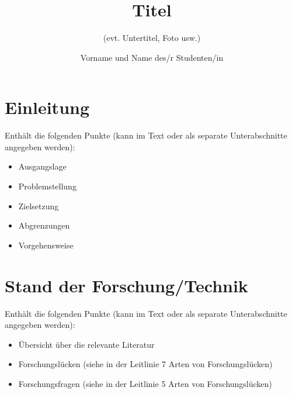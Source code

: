 \documentclass{ffhsthesis}
\begin{document}
\title{Titel}
\subtitle{(evt. Untertitel, Foto usw.)} %
\author{Vorname und Name des/r Studenten/in}

\maketitle

\newpage
\tableofcontents

\newpage

\startThesis %

\chapter{Einleitung}

Enthält die folgenden Punkte (kann im Text oder als separate Unterabschnitte angegeben werden):

\begin{itemize}
    \item Ausgangslage
    \item Problemstellung
    \item Zielsetzung
    \item Abgrenzungen
    \item Vorgehensweise
\end{itemize}

\chapter{Stand der Forschung/Technik}

Enthält die folgenden Punkte (kann im Text oder als separate Unterabschnitte angegeben werden):
\begin{itemize}
    \item Übersicht über die relevante Literatur
    \item Forschungslücken (siehe in der Leitlinie 7 Arten von Forschungslücken)
    \item Forschungsfragen (siehe in der Leitlinie 5 Arten von Forschungslücken)
\end{itemize}
\end{document}
